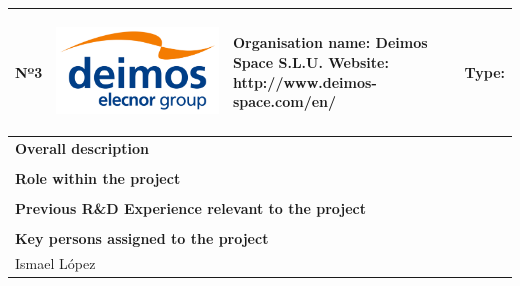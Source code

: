 \begin{longtable}[H]{|p{0.7cm}|p{4cm}|p{7cm}|p{1.3cm}|}
	\hline
	\begin{center} Nº3 \end{center} & \begin{center} \includegraphics[scale=0.05]{./logos/Blue-Logo_White-Background_EN} \end{center} & \begin{center} \textbf{Organisation name:} Deimos Space S.L.U. \newline \textbf{Website:} http://www.deimos-space.com/en/ \end{center} & \begin{center} Type: \end{center} \\ \hline
	
	\multicolumn{4}{|p{13cm}|}{\textbf{Overall description}}  \\ \hline
	
	\multicolumn{4}{|p{13cm}|}{}  \\ \hline
	
	\multicolumn{4}{|p{13cm}|}{\textbf{Role within the project}}   \\ \hline
	
	\multicolumn{4}{|p{13cm}|}{}  \\ \hline
	
	\multicolumn{4}{|p{13cm}|}{\textbf{Previous R\&D Experience relevant to the project}}  \\ \hline
	
	\multicolumn{4}{|p{13cm}|}{}  \\ \hline
	
	\multicolumn{4}{|p{13cm}|}{\textbf{Key persons assigned to the project}}   \\ \hline
	
	\multicolumn{4}{|p{13cm}|}{Ismael López}  \\ \hline
	

\end{longtable}
